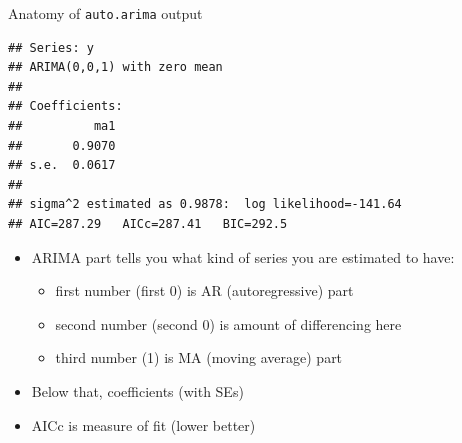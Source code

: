 \begin{frame}[fragile]{Anatomy of \texttt{auto.arima} output}

{\footnotesize  

\begin{knitrout}
\color{fgcolor}\begin{kframe}
\begin{alltt}
\end{alltt}
\begin{verbatim}
## Series: y 
## ARIMA(0,0,1) with zero mean     
## 
## Coefficients:
##          ma1
##       0.9070
## s.e.  0.0617
## 
## sigma^2 estimated as 0.9878:  log likelihood=-141.64
## AIC=287.29   AICc=287.41   BIC=292.5
\end{verbatim}
\end{kframe}
\end{knitrout}
}

\begin{itemize}
\item ARIMA part tells you what kind of series you are estimated to have:
\begin{itemize}
  \item first number (first 0) is AR (autoregressive) part
  \item second number (second 0) is amount of differencing here
  \item third number (1) is MA (moving average) part

\end{itemize}
  
\item Below that, coefficients (with SEs)
\item AICc is measure of fit (lower better)

\end{itemize}

\end{frame}

